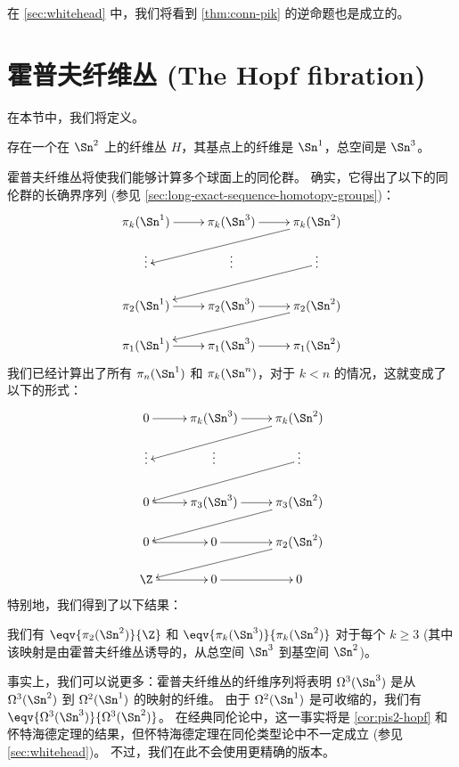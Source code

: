 {在 \cref{sec:whitehead} 中，我们将看到 \cref{thm:conn-pik} 的逆命题也是成立的。

%
%

\section{霍普夫纤维丛 (The Hopf fibration)}
\label{sec:hopf}

在本节中，我们将定义。
%

\begin{thm}\label{thm:hopf-fibration}
存在一个在 $\Sn^2$ 上的纤维丛 $H$，其基点上的纤维是 $\Sn^1$，总空间是 $\Sn^3$。
\end{thm}

霍普夫纤维丛将使我们能够计算多个球面上的同伦群。
确实，它得出了以下的同伦群的长确界序列
(参见 \cref{sec:long-exact-sequence-homotopy-groups})：
%
\[
  \xymatrix@R=1.2pc{
    \pi_k(\Sn^1) \ar[r] & \pi_k(\Sn^3) \ar[r] & \pi_k(\Sn^2) \ar[lld] \\
    \vdots & \vdots & \vdots \ar[lld] \\
    \pi_2(\Sn^1) \ar[r] & \pi_2(\Sn^3) \ar[r] & \pi_2(\Sn^2) \ar[lld] \\
    \pi_1(\Sn^1) \ar[r] & \pi_1(\Sn^3) \ar[r] & \pi_1(\Sn^2)}
\]
%
我们已经计算出了所有 $\pi_n(\Sn^1)$ 和 $\pi_k(\Sn^n)$，对于 $k<n$ 的情况，这就变成了以下的形式：
%
\[
  \xymatrix@R=1.2pc{
    0 \ar[r] & \pi_k(\Sn^3) \ar[r] & \pi_k(\Sn^2) \ar[lld] \\
    \vdots & \vdots & \vdots \ar[lld] \\
    0 \ar[r] & \pi_3(\Sn^3) \ar[r] & \pi_3(\Sn^2) \ar[lld] \\
    0 \ar[r] & 0 \ar[r] & \pi_2(\Sn^2) \ar[lld] \\
    \Z \ar[r] & 0 \ar[r] & 0}
\]
%
特别地，我们得到了以下结果：

\begin{cor} \label{cor:pis2-hopf}
我们有 $\eqv{\pi_2(\Sn^2)}{\Z}$ 和 $\eqv{\pi_k(\Sn^3)}{\pi_k(\Sn^2)}$ 对于每个 $k\ge3$ (其中该映射是由霍普夫纤维丛诱导的，从总空间 $\Sn^3$ 到基空间 $\Sn^2$)。
\end{cor}

事实上，我们可以说更多：霍普夫纤维丛的纤维序列将表明 $\Omega^3(\Sn^3)$ 是从 $\Omega^3(\Sn^2)$ 到 $\Omega^2(\Sn^1)$ 的映射的纤维。
由于 $\Omega^2(\Sn^1)$ 是可收缩的，我们有 $\eqv{\Omega^3(\Sn^3)}{\Omega^3(\Sn^2)}$。
在经典同伦论中，这一事实将是 \cref{cor:pis2-hopf} 和怀特海德定理的结果，但怀特海德定理在同伦类型论中不一定成立 (参见 \cref{sec:whitehead})。
不过，我们在此不会使用更精确的版本。

}
